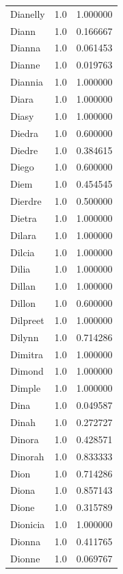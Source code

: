 \documentclass[
  letterpaper,
  DIV=11,
  numbers=noendperiod]{scrreprt}
\begin{document}
\begin{tabular}{lrr}
Dianelly        &   1.0 &   1.000000 \\
Diann           &   1.0 &   0.166667 \\
Dianna          &   1.0 &   0.061453 \\
Dianne          &   1.0 &   0.019763 \\
Diannia         &   1.0 &   1.000000 \\
Diara           &   1.0 &   1.000000 \\
Diasy           &   1.0 &   1.000000 \\
Diedra          &   1.0 &   0.600000 \\
Diedre          &   1.0 &   0.384615 \\
Diego           &   1.0 &   0.600000 \\
Diem            &   1.0 &   0.454545 \\
Dierdre         &   1.0 &   0.500000 \\
Dietra          &   1.0 &   1.000000 \\
Dilara          &   1.0 &   1.000000 \\
Dilcia          &   1.0 &   1.000000 \\
Dilia           &   1.0 &   1.000000 \\
Dillan          &   1.0 &   1.000000 \\
Dillon          &   1.0 &   0.600000 \\
Dilpreet        &   1.0 &   1.000000 \\
Dilynn          &   1.0 &   0.714286 \\
Dimitra         &   1.0 &   1.000000 \\
Dimond          &   1.0 &   1.000000 \\
Dimple          &   1.0 &   1.000000 \\
Dina            &   1.0 &   0.049587 \\
Dinah           &   1.0 &   0.272727 \\
Dinora          &   1.0 &   0.428571 \\
Dinorah         &   1.0 &   0.833333 \\
Dion            &   1.0 &   0.714286 \\
Diona           &   1.0 &   0.857143 \\
Dione           &   1.0 &   0.315789 \\
Dionicia        &   1.0 &   1.000000 \\
Dionna          &   1.0 &   0.411765 \\
Dionne          &   1.0 &   0.069767 \\

\end{tabular}
\end{document}
